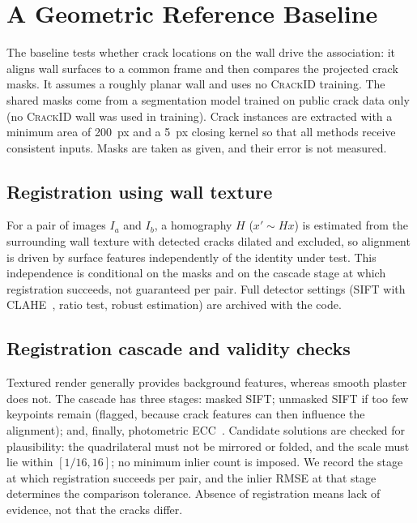 \section{A Geometric Reference Baseline}
\label{sec:method}

The baseline tests whether crack locations on the wall drive the association: it aligns wall surfaces to a common frame and then compares the projected crack masks.
It assumes a roughly planar wall and uses no \textsc{CrackID} training.
The shared masks come from a segmentation model trained on public crack data only (no \textsc{CrackID} wall was used in training).
Crack instances are extracted with a minimum area of 200~px and a 5~px closing kernel so that all methods receive consistent inputs.
Masks are taken as given, and their error is not measured.

\subsection{Registration using wall texture}
\label{sec:registration}

For a pair of images $I_a$ and $I_b$, a homography $H$ ($x' \sim Hx$) is estimated from the surrounding wall texture with detected cracks dilated and excluded, so alignment is driven by surface features independently of the identity under test.
This independence is conditional on the masks and on the cascade stage at which registration succeeds, not guaranteed per pair.
Full detector settings (SIFT with CLAHE~\cite{zuiderveld1994clahe}, ratio test, robust estimation) are archived with the code.

\subsection{Registration cascade and validity checks}

Textured render generally provides background features, whereas smooth plaster does not.
The cascade has three stages: masked SIFT; unmasked SIFT if too few keypoints remain (flagged, because crack features can then influence the alignment); and, finally, photometric ECC~\cite{evangelidis2008ecc}.
Candidate solutions are checked for plausibility: the quadrilateral must not be mirrored or folded, and the scale must lie within $[1/16,16]$; no minimum inlier count is imposed.
We record the stage at which registration succeeds per pair, and the inlier RMSE at that stage determines the comparison tolerance.
Absence of registration means lack of evidence, not that the cracks differ.


